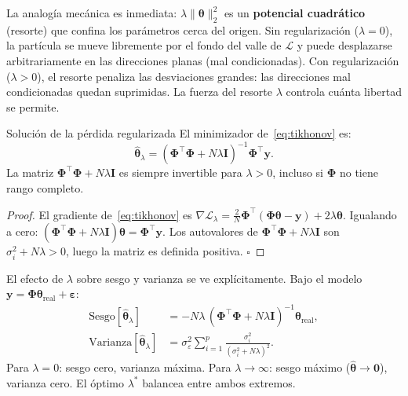 La analogía mecánica es inmediata: $\lambda\|\bm{\theta}\|_2^2$ es un
\textbf{potencial cuadrático} (resorte) que confina los parámetros
cerca del origen. Sin regularización ($\lambda = 0$), la partícula se
mueve libremente por el fondo del valle de $\mathcal{L}$ y puede
desplazarse arbitrariamente en las direcciones planas (mal
condicionadas). Con regularización ($\lambda > 0$), el resorte penaliza
las desviaciones grandes: las direcciones mal condicionadas quedan
suprimidas. La fuerza del resorte $\lambda$ controla cuánta libertad
se permite.

\begin{proposicion}{Solución de la pérdida regularizada}
\label{prop:sol_tikhonov}
El minimizador de~\eqref{eq:tikhonov} es:
\begin{equation}
  \hat{\bm{\theta}}_\lambda
  = (\bm{\Phi}^\top\bm{\Phi} + N\lambda\bm{I})^{-1}
  \bm{\Phi}^\top\bm{y}.
  \label{eq:sol_tikhonov}
\end{equation}
La matriz $\bm{\Phi}^\top\bm{\Phi} + N\lambda\bm{I}$ es siempre
invertible para $\lambda > 0$, incluso si $\bm{\Phi}$ no tiene rango
completo.
\end{proposicion}

\begin{proof}
El gradiente de~\eqref{eq:tikhonov} es
$\nabla\mathcal{L}_\lambda = \frac{2}{N}
\bm{\Phi}^\top(\bm{\Phi}\bm{\theta}-\bm{y}) + 2\lambda\bm{\theta}$.
Igualando a cero:
$(\bm{\Phi}^\top\bm{\Phi} + N\lambda\bm{I})\bm{\theta} =
\bm{\Phi}^\top\bm{y}$. Los autovalores de
$\bm{\Phi}^\top\bm{\Phi} + N\lambda\bm{I}$ son
$\sigma_i^2 + N\lambda > 0$, luego la matriz es definida positiva.
$\square$
\end{proof}

El efecto de $\lambda$ sobre sesgo y varianza se ve explícitamente.
Bajo el modelo $\bm{y} = \bm{\Phi}\bm{\theta}_{\text{real}} +
\bm{\varepsilon}$:
\begin{align}
  \text{Sesgo}[\hat{\bm{\theta}}_\lambda]
  &= -N\lambda\,(\bm{\Phi}^\top\bm{\Phi}+N\lambda\bm{I})^{-1}
  \bm{\theta}_{\text{real}},
  \label{eq:sesgo_tikh}\\
  \text{Varianza}[\hat{\bm{\theta}}_\lambda]
  &= \sigma_\varepsilon^2 \sum_{i=1}^p
  \frac{\sigma_i^2}{(\sigma_i^2 + N\lambda)^2}.
  \label{eq:var_tikh}
\end{align}
Para $\lambda = 0$: sesgo cero, varianza máxima. Para $\lambda \to
\infty$: sesgo máximo ($\hat{\bm{\theta}} \to \bm{0}$), varianza cero.
El óptimo $\lambda^*$ balancea entre ambos extremos.

